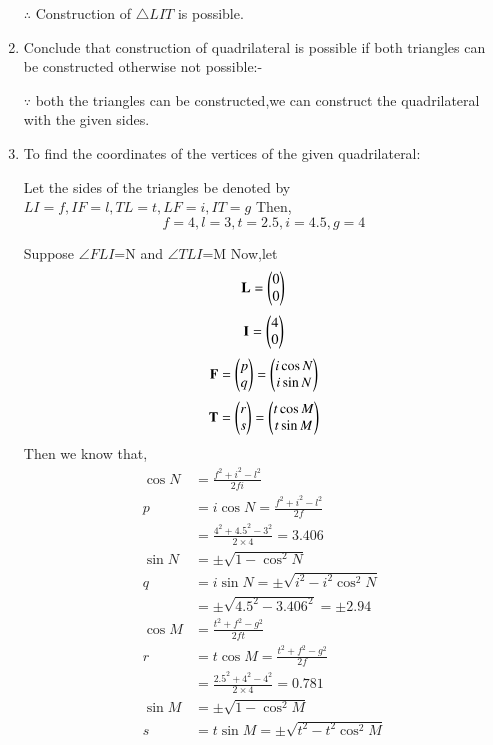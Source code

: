 \documentclass[journal,12pt,twocolumn]{IEEEtran}
\begin{document}
\begin{enumerate}
    $\therefore$ Construction of $\triangle LIT$ is possible.
\item Conclude that construction of quadrilateral is possible if both triangles can be constructed otherwise not possible:-

$\because$ both the triangles can be constructed,we can construct the quadrilateral with the given sides.
\item To find the coordinates of the vertices of the given quadrilateral:

Let the sides of the triangles be denoted by $LI=f,IF=l,TL=t,LF=i,IT=g$ 
Then,
\begin{equation}
   f=4,l=3,t=2.5,i=4.5,g=4 
\end{equation}

Suppose $\angle FLI$=N and  $\angle TLI$=M
Now,let
\begin{equation}
   \mathbf{L}=\begin{pmatrix}0\\0\end{pmatrix} \label{eq1}
\end{equation}
\begin{equation}
    \mathbf{I}=\begin{pmatrix}4\\0\end{pmatrix} \label{eq2}
\end{equation}
\begin{equation}
     \mathbf{F}=\begin{pmatrix}p\\q\end{pmatrix}=\begin{pmatrix}i\cos N\\i\sin N\end{pmatrix} \label{eq3}
\end{equation}
\begin{equation}
    \mathbf{T}=\begin{pmatrix}r\\s\end{pmatrix}=\begin{pmatrix}t\cos M\\t\sin M\end{pmatrix} \label{eq4}
\end{equation}
Then we know that,
\begin{align}
  \cos N&=\frac{f^2+i^2-l^2}{2fi}\\
    p&=i\cos N=\frac{f^2+i^2-l^2}{2f}\\
    &=\frac{4^2+4.5^2-3^2}{2\times 4}=3.406\\
   \sin N&=\pm\sqrt{1-\cos^2 N}\\
   q&=i\sin N=\pm\sqrt{i^2-i^2\cos^2 N}\\
   &=\pm\sqrt{4.5^2-3.406^2}=\pm2.94\\
   \cos M&=\frac{t^2+f^2-g^2}{2ft}\\
  r&= t\cos M=\frac{t^2+f^2-g^2}{2f}\\
    &=\frac{2.5^2+4^2-4^2}{2\times 4}=0.781\\
     \sin M&=\pm\sqrt{1-\cos^2 M}\\
  s&= t\sin M=\pm\sqrt{t^2-t^2\cos^2 M}\\

\end{align}
\end{enumerate}
\end{document}
